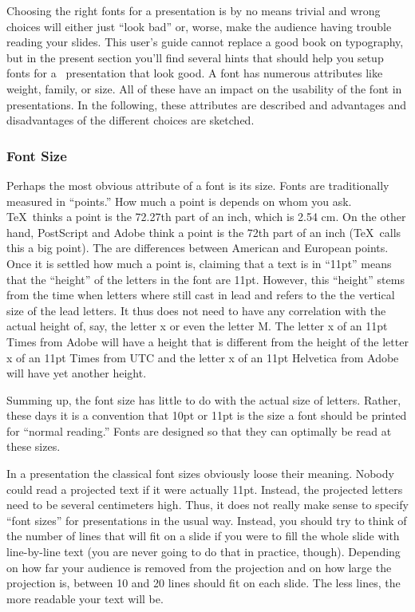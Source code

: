 Choosing the right fonts for a presentation is by no means
trivial and wrong choices will either just ``look bad'' or, worse,
make the audience having trouble reading your slides.
This user's guide cannot replace a good book on typography, but in the
present section you'll find several hints that should help you setup 
fonts for a \beamer\ presentation that look good.
A font has numerous attributes like weight, family, or size. All of
these have an impact on the usability of the font in
presentations. In the following, these attributes are described and
advantages and disadvantages of the different choices are sketched.


\subsubsection{Font Size}

\label{section-sizes}

Perhaps the most obvious attribute of a font is its size. Fonts are
traditionally measured in ``points.'' How much a point is depends on
whom you ask. \TeX\ thinks a point is the 72.27th part of an inch,
which is 2.54 cm. On the other hand, PostScript and Adobe think a
point is the 72th part of an inch (\TeX\ calls this a big point). The
are differences between American and European points. Once it is
settled how much a point is, claiming that a text is in ``11pt'' means
that the ``height'' of the letters in the font are 11pt. However, this
``height'' stems from the time when letters where still cast in lead
and refers to the the vertical size of the lead letters. It thus does
not need to have any correlation with the actual height of, say, the
letter x or even the letter M. The letter x of an 11pt Times from
Adobe will have a height that is different from the height of the
letter x of an 11pt Times from UTC and the letter x of an 11pt
Helvetica from Adobe will have yet another height.

Summing up, the font size has little to do with the actual size of
letters. Rather, these days it is a convention that 10pt or 11pt is
the size a font should be printed for ``normal reading.'' Fonts are
designed so that they can optimally be read at these sizes.

In a presentation the classical font sizes obviously loose their
meaning. Nobody could read a projected text if it were actually
11pt. Instead, the projected letters need to be several centimeters
high. Thus, it does not really make sense to specify ``font sizes''
for presentations in the usual way. Instead, you should try to think
of the number of lines that will fit on a slide if you were to fill
the whole slide with line-by-line text (you are never going to do that
in practice, though). Depending on how far your audience is removed
from the projection and on how large the projection is, between 10 and
20 lines should fit on each slide. The less lines, the more readable
your text will be.

